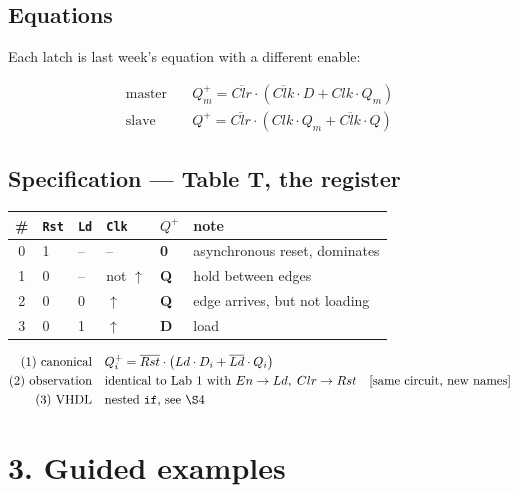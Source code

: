 \documentclass[11pt]{article}
\newcommand{\code}[1]{\texttt{#1}}
\begin{document}
\subsection*{Equations}

Each latch is last week's equation with a different enable:

\begin{align*}
\text{master} \quad & Q_m^{+} = \overline{Clr}\cdot\left( \overline{Clk}\cdot D + Clk\cdot Q_m \right)\\
\text{slave}  \quad & Q^{+}   = \overline{Clr}\cdot\left( Clk\cdot Q_m + \overline{Clk}\cdot Q \right)
\end{align*}

\subsection*{Specification --- Table T, the register}

\begin{center}
\begin{tabular}{clll@{\hskip 8pt}||@{\hskip 8pt}ll}
\toprule
\# & \code{Rst} & \code{Ld} & \code{Clk} & $Q^{+}$ & note \\
\midrule
0 & 1 & -- & -- & \textbf{0} & asynchronous reset, dominates \\
1 & 0 & -- & not $\uparrow$ & \textbf{Q} & hold between edges \\
2 & 0 & 0 & $\uparrow$ & \textbf{Q} & edge arrives, but not loading \\
3 & 0 & 1 & $\uparrow$ & \textbf{D} & load \\
\bottomrule
\end{tabular}
\end{center}

\begin{align*}
\text{(1) canonical} \quad & Q_i^{+} = \overline{Rst}\cdot\left( Ld\cdot D_i + \overline{Ld}\cdot Q_i \right)\\
\text{(2) observation} \quad & \text{identical to Lab 1 with } En \to Ld,\; Clr \to Rst
  \quad \text{[same circuit, new names]}\\
\text{(3) VHDL} \quad & \text{nested \code{if}, see \S4}
\end{align*}

\section*{3. Guided examples}
\end{document}
